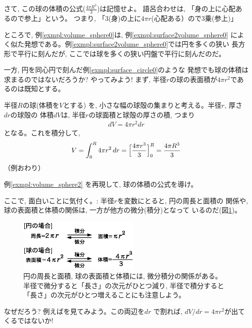 さて, この球の体積の公式($\frac{4\pi R^3}{3}$)は記憶せよ。
語呂合わせは, 「身の上に心配あるので参上」という。
つまり, 「3(身)の上に$4\pi r$(心配ある）ので3乗(参上)」

ところで, 例\ref{exmpl:volume_sphere0}は, 例\ref{exmpl:surface2volume_sphere0}
によく似た発想である。例\ref{exmpl:surface2volume_sphere0}では円を多くの狭い
長方形で平行に刻んだが, ここでは球を多くの狭い円盤で平行に刻んだのだ。

一方, 円を同心円で刻んだ例\ref{exmpl:surface_circle0}のような
発想でも球の体積は求まるのではないだろうか? やってみよう! 
まず, 半径$r$の球の表面積が$4\pi r^2$であるのは既知とする。

\begin{exmpl}\label{exmpl:volume_sphere2} 半径$R$の球(体積を$V$とする)
を, 小さな幅の球殻の集まりと考える。半径$r$, 厚さ$dr$の球殻の
体積$dV$は, 半径$r$の球面積と球殻の厚さの積, つまり
\begin{eqnarray}
dV=4\pi r^2dr\label{eq:volume_sphere3}
\end{eqnarray}
となる。これを積分して, 
\begin{eqnarray}
V=\int_{0}^{R}4\pi r^2\,dr=\Bigl[\frac{4\pi r^3}{3}\Bigr]_0^R
=\frac{4\pi R^3}{3}\label{eq:volume_sphere4}
\end{eqnarray}
（例おわり）
\end{exmpl}\mv

\begin{q}\label{q:int_ball3} 例\ref{exmpl:volume_sphere2}
を再現して, 球の体積の公式を導け。\end{q}
\mv


ここで, 面白いことに気付く。: 半径$r$を変数にとると, 円の周長と面積の
関係や, 球の表面積と体積の関係は, 一方が他方の微分(積分)となって
いるのだ(図\ref{fig:circle_ball_biseki})。
\begin{figure}[h]
    \centering
    \includegraphics[width=6cm]{circle_ball_biseki.eps}
    \caption{円の周長と面積, 球の表面積と体積には, 微分積分の関係がある。
半径で微分すると「長さ」の次元がひとつ減り, 半径で積分すると
「長さ」の次元がひとつ増えることにも注意しよう。}\label{fig:circle_ball_biseki}
\end{figure}

なぜだろう? 例えばを見てみよう。この両辺を$dr$
で割れば, $dV/dr=4\pi r^2$が出てくるではないか!

